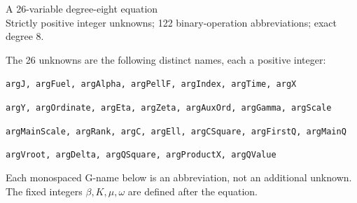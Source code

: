 \documentclass[10pt]{article}
\begin{document}
\begin{center}{\Large A 26-variable degree-eight equation}\\
Strictly positive integer unknowns; 122 binary-operation abbreviations; exact degree 8.
\end{center}
The 26 unknowns are the following distinct names, each a positive integer:
\par\small
\noindent\texttt{argJ, argFuel, argAlpha, argPellF, argIndex, argTime, argX}\par
\noindent\texttt{argY, argOrdinate, argEta, argZeta, argAuxOrd, argGamma, argScale}\par
\noindent\texttt{argMainScale, argRank, argC, argEll, argCSquare, argFirstQ, argMainQ}\par
\noindent\texttt{argVroot, argDelta, argQSquare, argProductX, argQValue}\par
\normalsize
Each monospaced G-name below is an abbreviation, not an additional unknown.
The fixed integers $\beta,K,\mu,\omega$ are defined after the equation.
\end{document}
